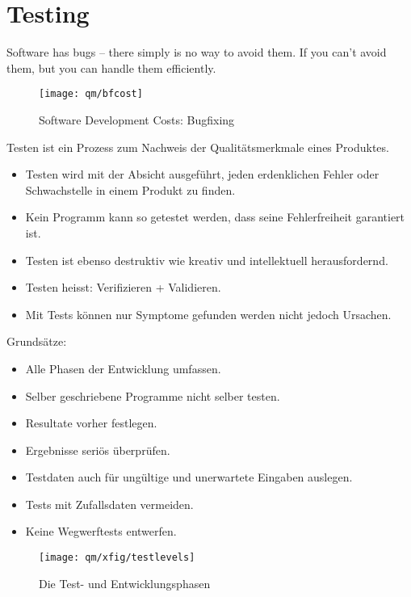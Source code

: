 \chapter{Testing}

Software has bugs – there simply is no way to avoid them. If you can't avoid
them, but you can handle them efficiently.

\begin{figure}[H]
\begin{center}
\texttt{[image: qm/bfcost]}
\caption{Software Development Costs: Bugfixing}
\end{center}
\end{figure}

%
Testen ist ein Prozess zum Nachweis der Qualitätsmerkmale eines
Produktes.
\begin{itemize}
\item Testen wird mit der Absicht ausgeführt,
jeden erdenklichen Fehler oder Schwachstelle in einem Produkt zu finden.
\item Kein Programm kann so getestet werden, dass seine Fehlerfreiheit
garantiert ist.
\item Testen ist ebenso destruktiv wie
  kreativ und intellektuell herausfordernd.
\item Testen heisst: Verifizieren + Validieren.
\item Mit Tests können nur Symptome gefunden werden nicht jedoch Ursachen.
\end{itemize}
\ifslides
\newpage
\fi
Grunds\"atze:
\begin{itemize}
\item Alle Phasen der Entwicklung umfassen.
\item Selber geschriebene Programme nicht selber testen.
\item Resultate vorher festlegen.
\item Ergebnisse seri\"os \"uberpr\"ufen.
\item Testdaten auch f\"ur ung\"ultige und unerwartete Eingaben auslegen.
\item Tests mit Zufallsdaten vermeiden. %
\item Keine Wegwerftests entwerfen.
\end{itemize}
\newslide
\begin{figure}[H]
\begin{center}
\texttt{[image: qm/xfig/testlevels]}
\caption{Die Test- und Entwicklungsphasen}
\end{center}
\end{figure}
\newslide
